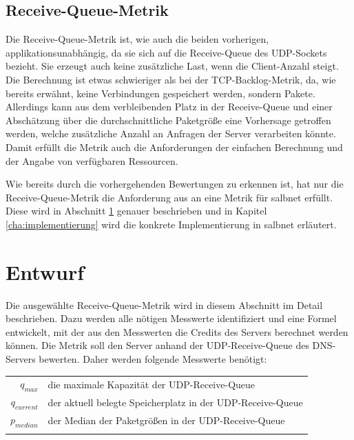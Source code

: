 \documentclass[a4paper, 12pt, BCOR10mm, DIV12, toc=bibliography, toc=listof, german]{scrbook}
\begin{document}

		\subsection*{Receive-Queue-Metrik} %

		Die Receive-Queue-Metrik ist, wie auch die beiden vorherigen, applikationsunabhängig, da sie
		sich auf die Receive-Queue des UDP-Sockets bezieht. Sie erzeugt auch keine zusätzliche Last,
		wenn die Client-Anzahl steigt. Die Berechnung ist etwas schwieriger als bei der
		TCP-Backlog-Metrik, da, wie bereits erwähnt, keine Verbindungen gespeichert werden, sondern
		Pakete. Allerdings kann aus dem verbleibenden Platz in der Receive-Queue und einer Abschätzung
		über die durchschnittliche Paketgröße eine Vorhersage getroffen werden, welche zusätzliche
		Anzahl an Anfragen der Server verarbeiten könnte. Damit erfüllt die Metrik auch die
		Anforderungen der einfachen Berechnung und der Angabe von verfügbaren Ressourcen.


		Wie bereits durch die vorhergehenden Bewertungen zu erkennen ist, hat nur die Receive-Queue-Metrik die
		Anforderung aus \cite{scsczile2008} an eine Metrik für salbnet erfüllt. Diese wird in Abschnitt
		\ref{sec:entwurf} genauer beschrieben und in Kapitel \ref{cha:implementierung} wird die
		konkrete Implementierung in salbnet erläutert.


		\section{Entwurf} %
		\label{sec:entwurf}

		Die ausgewählte Receive-Queue-Metrik wird in diesem Abschnitt im Detail beschrieben.
		Dazu werden alle nötigen Messwerte identifiziert und eine Formel entwickelt, mit der aus den
		Messwerten die Credits des Servers berechnet werden können. Die Metrik soll den Server anhand der
		UDP-Receive-Queue des DNS-Servers bewerten. Daher werden folgende Messwerte benötigt: $~$\\
		
		\begin{tabular}{rl}
			$q_{max}$		  & die maximale Kapazität der UDP-Receive-Queue\\
			$q_{current}$ &	der aktuell belegte Speicherplatz in der UDP-Receive-Queue\\
			$p_{median}$  &	der Median der Paketgrößen in der UDP-Receive-Queue\\
										& \\
		\end{tabular}
\end{document}
